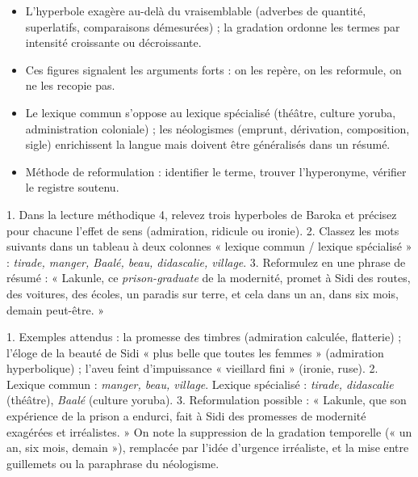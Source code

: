 \documentclass[11pt]{article}
\newcommand{\cle}[1]{{\popxbold\color{popdark}#1}}
\begin{document}
\begin{aretenir}
\begin{itemize}
\item L'\cle{hyperbole} exagère au-delà du vraisemblable (adverbes de quantité, superlatifs, comparaisons démesurées) ; la \cle{gradation} ordonne les termes par intensité croissante ou décroissante.
\item Ces figures signalent les arguments forts : on les repère, on les reformule, on ne les recopie pas.
\item Le \cle{lexique commun} s'oppose au \cle{lexique spécialisé} (théâtre, culture yoruba, administration coloniale) ; les \cle{néologismes} (emprunt, dérivation, composition, sigle) enrichissent la langue mais doivent être généralisés dans un résumé.
\item Méthode de reformulation : identifier le terme, trouver l'hyperonyme, vérifier le registre soutenu.
\end{itemize}
\end{aretenir}

\begin{exercice}
1. Dans la lecture méthodique 4, relevez trois hyperboles de Baroka et précisez pour chacune l'effet de sens (admiration, ridicule ou ironie). 2. Classez les mots suivants dans un tableau à deux colonnes « lexique commun / lexique spécialisé » : \emph{tirade, manger, Baalé, beau, didascalie, village}. 3. Reformulez en une phrase de résumé : « Lakunle, ce \emph{prison-graduate} de la modernité, promet à Sidi des routes, des voitures, des écoles, un paradis sur terre, et cela dans un an, dans six mois, demain peut-être. »
\end{exercice}

\begin{corrige}
1. Exemples attendus : la promesse des timbres (admiration calculée, flatterie) ; l'éloge de la beauté de Sidi « plus belle que toutes les femmes » (admiration hyperbolique) ; l'aveu feint d'impuissance « vieillard fini » (ironie, ruse). 2. Lexique commun : \emph{manger, beau, village}. Lexique spécialisé : \emph{tirade, didascalie} (théâtre), \emph{Baalé} (culture yoruba). 3. Reformulation possible : « Lakunle, que son expérience de la prison a endurci, fait à Sidi des promesses de modernité exagérées et irréalistes. » On note la suppression de la gradation temporelle (« un an, six mois, demain »), remplacée par l'idée d'urgence irréaliste, et la mise entre guillemets ou la paraphrase du néologisme.
\end{corrige}
\end{document}
